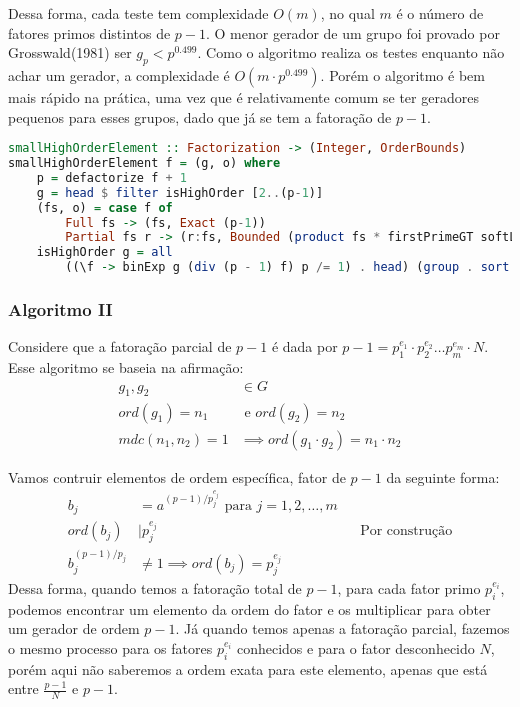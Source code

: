 \documentclass{article}
\begin{document}
Dessa forma, cada teste tem complexidade $O(m)$, no qual $m$ é o número de fatores primos distintos de $p-1$. O menor gerador de um grupo foi provado por Grosswald(1981) ser $g_p < p^{0.499}$. Como o algoritmo realiza os testes enquanto não achar um gerador, a complexidade é $O(m \cdot p ^{0.499})$. Porém o algoritmo é bem mais rápido na prática, uma vez que é relativamente comum se ter geradores pequenos para esses grupos, dado que já se tem a fatoração de $p-1$.

\noindent\hspace{0.03\linewidth}
\begin{minipage}{.9\linewidth}
\begin{lstlisting}[language=haskell, caption=Busca pelo Menor Gerador]
smallHighOrderElement :: Factorization -> (Integer, OrderBounds)
smallHighOrderElement f = (g, o) where
    p = defactorize f + 1
    g = head $ filter isHighOrder [2..(p-1)]
    (fs, o) = case f of
        Full fs -> (fs, Exact (p-1))
        Partial fs r -> (r:fs, Bounded (product fs * firstPrimeGT softLimit) (p-1))
    isHighOrder g = all
        ((\f -> binExp g (div (p - 1) f) p /= 1) . head) (group . sort $ fs)

\end{lstlisting}
\end{minipage}

\subsubsection{Algoritmo II}
Considere que a fatoração parcial de $p-1$ é dada por $p-1 = p_1^{e_1}\cdot p_2^{e_2} \dots p_m^{e_m} \cdot N$.
Esse algoritmo se baseia na afirmação:
\begin{align*}
g_1, g_2 &\in G\\
ord(g_1) = n_1 &\text{ e } ord(g_2) = n_2\\
mdc(n_1, n_2) = 1 &\implies ord(g_1 \cdot g_2) = n_1 \cdot n_2
\end{align*}

Vamos contruir elementos de ordem específica, fator de $p-1$ da seguinte forma:
\begin{align*}
b_j &= a^{(p-1)/p_j^{e_j}} \text{ para } j = 1, 2, \dots, m\\
ord(b_j) &| p_j^{e_j}                           &&\text{Por construção}\\
b_j ^ {(p-1)/p_j} &\neq 1 \implies ord(b_j)=p_j^{e_j}
\end{align*}
Dessa forma, quando temos a fatoração total de $p-1$, para cada fator primo $p_i^{e_i}$, podemos encontrar um elemento da ordem do fator e os multiplicar para obter um gerador de ordem $p-1$. 
Já quando temos apenas a fatoração parcial, fazemos o mesmo processo para os fatores $p_i^{e_i}$ conhecidos e para o fator desconhecido $N$, porém aqui não saberemos a ordem exata para este elemento, apenas que está entre $\frac{p-1}{N}$ e $p-1$. 
\end{document}

